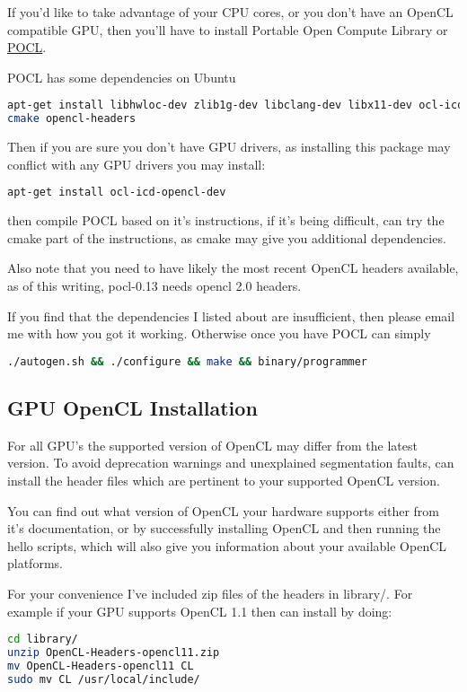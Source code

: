 \documentclass[12pt]{report}
\begin{document}
If you'd like to take advantage of your CPU cores, or
you don't have an OpenCL compatible GPU, then you'll have to install 
Portable Open Compute Library or
\href{http://pocl.sourceforge.net/}{POCL}.

POCL has some dependencies on Ubuntu
\begin{lstlisting}[language=bash]
apt-get install libhwloc-dev zlib1g-dev libclang-dev libx11-dev ocl-icd-dev
cmake opencl-headers
\end{lstlisting}

Then if you are sure you don't have GPU drivers, as installing this package may
conflict with any GPU drivers you may install:
\begin{lstlisting}[language=bash]
apt-get install ocl-icd-opencl-dev
\end{lstlisting}

then compile POCL based on it's instructions, if it's being difficult, can try
the cmake part of the instructions, as cmake may give you additional
dependencies. 

Also note that you need to have likely the most recent OpenCL headers available, 
as of this writing, pocl-0.13 needs opencl 2.0 headers.

If you find that the dependencies I listed about are insufficient, then please
email me with how you got it working.
Otherwise once you have POCL can simply 
\begin{lstlisting}[language=bash]
./autogen.sh && ./configure && make && binary/programmer
\end{lstlisting}

\subsection{GPU  OpenCL Installation}

For all GPU's the supported version of OpenCL may differ from the latest
version. To avoid deprecation warnings and unexplained segmentation faults, 
can install the header files which are pertinent to your supported OpenCL version. 

You can find out what version of OpenCL your hardware supports either from it's
documentation, or by successfully installing OpenCL and then running the hello
scripts, which will also give you information about your available OpenCL
platforms. 

For your convenience I've included zip files of the headers in library/.
For example if your GPU supports OpenCL 1.1 then can install by doing:
\begin{lstlisting}[language=bash]
cd library/
unzip OpenCL-Headers-opencl11.zip 
mv OpenCL-Headers-opencl11 CL
sudo mv CL /usr/local/include/
\end{lstlisting}
\end{document}
